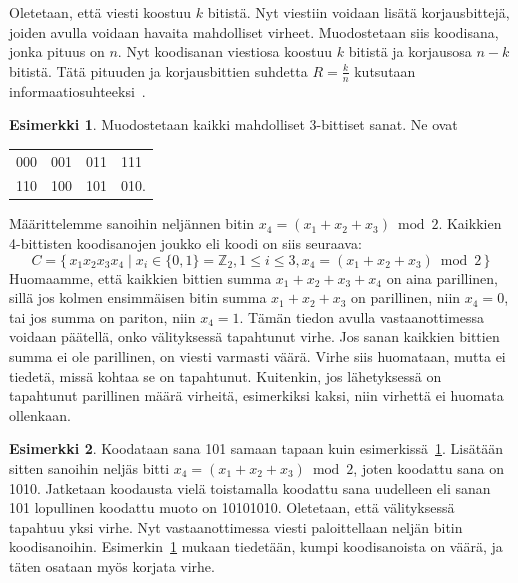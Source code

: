 \documentclass[a4paper,12pt,leqno,oneside]{report} %
\theoremstyle{plain}
\theoremstyle{plain}
\theoremstyle{definition}
\newtheorem{esimerkki}{Esimerkki}[chapter]
\theoremstyle{remark}
\numberwithin{equation}{chapter}
\newcommand*{\Zset}{\mathbb{Z}}  %
\begin{document}
    Oletetaan, että viesti koostuu $k$ bitistä. Nyt viestiin voidaan lisätä korjausbittejä, joiden avulla voidaan havaita mahdolliset virheet. Muodostetaan siis koodisana, jonka pituus on $n$. Nyt koodisanan viestiosa koostuu $k$ bitistä ja korjausosa $n-k$ bitistä. Tätä pituuden ja korjausbittien suhdetta $R = \frac{k}{n}$ kutsutaan informaatiosuhteeksi~\cite[s.~267]{GW}.
    \begin{esimerkki}\label{esim:3bitsanat}
        Muodostetaan kaikki mahdolliset 3-bittiset sanat. Ne ovat
        \begin{center}
            \begin{tabular}[t]{llll}
                000 & 001 & 011 & 111 \\
                110 & 100 & 101 & 010. \\
            \end{tabular}
        \end{center}
        Määrittelemme sanoihin neljännen bitin
        $x_4 = (x_1 + x_2 + x_3) \bmod2$. Kaikkien 4-bittisten koodisanojen joukko eli koodi on siis seuraava:
        \[
            C = \{\, x_1x_2x_3x_4 \mid  x_i \in \{0,1\} = \Zset_2, 1 \le i \le 3, x_4 = (x_1 + x_2 + x_3) \bmod2\,\}
        \]
        Huomaamme, että kaikkien bittien summa $x_1 + x_2 + x_3 + x_4$ on aina parillinen, sillä jos kolmen ensimmäisen bitin summa $x_1 + x_2 + x_3$ on parillinen, niin $x_4 = 0$, tai jos summa on pariton, niin $x_4 = 1$.
        Tämän tiedon avulla vastaanottimessa voidaan päätellä, onko välityksessä tapahtunut virhe. Jos sanan kaikkien bittien summa ei ole parillinen, on viesti varmasti väärä. Virhe siis huomataan, mutta ei tiedetä, missä kohtaa se on tapahtunut. Kuitenkin, jos lähetyksessä on tapahtunut parillinen määrä virheitä, esimerkiksi kaksi, niin virhettä ei huomata ollenkaan.
    \end{esimerkki}
    \begin{esimerkki}\label{esim:3bitsanatjatko}
        Koodataan sana 101 samaan tapaan kuin
        esimerkissä~\ref{esim:3bitsanat}. Lisätään sitten sanoihin neljäs bitti $x_4 = (x_1 + x_2 + x_3) \bmod2$, joten koodattu sana on 1010. Jatketaan koodausta vielä toistamalla koodattu sana uudelleen eli sanan 101 lopullinen koodattu muoto on 10101010. Oletetaan, että välityksessä tapahtuu yksi virhe. Nyt vastaanottimessa viesti paloittellaan neljän bitin koodisanoihin. Esimerkin~\ref{esim:3bitsanat} mukaan tiedetään, kumpi koodisanoista on väärä, ja täten osataan myös korjata virhe.
    \end{esimerkki}
\end{document}
